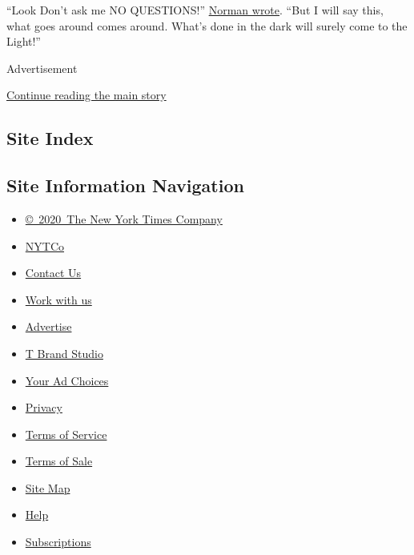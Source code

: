 ``Look Don't ask me NO QUESTIONS!''
\href{https://twitter.com/J_No24/status/1283612952856334336}{Norman
wrote}. ``But I will say this, what goes around comes around. What's
done in the dark will surely come to the Light!''

Advertisement

\protect\hyperlink{after-bottom}{Continue reading the main story}

\hypertarget{site-index}{%
\subsection{Site Index}\label{site-index}}

\hypertarget{site-information-navigation}{%
\subsection{Site Information
Navigation}\label{site-information-navigation}}

\begin{itemize}
\tightlist
\item
  \href{https://help.nytimes3xbfgragh.onion/hc/en-us/articles/115014792127-Copyright-notice}{©~2020~The
  New York Times Company}
\end{itemize}

\begin{itemize}
\tightlist
\item
  \href{https://www.nytco.com/}{NYTCo}
\item
  \href{https://help.nytimes3xbfgragh.onion/hc/en-us/articles/115015385887-Contact-Us}{Contact
  Us}
\item
  \href{https://www.nytco.com/careers/}{Work with us}
\item
  \href{https://nytmediakit.com/}{Advertise}
\item
  \href{http://www.tbrandstudio.com/}{T Brand Studio}
\item
  \href{https://www.nytimes3xbfgragh.onion/privacy/cookie-policy\#how-do-i-manage-trackers}{Your
  Ad Choices}
\item
  \href{https://www.nytimes3xbfgragh.onion/privacy}{Privacy}
\item
  \href{https://help.nytimes3xbfgragh.onion/hc/en-us/articles/115014893428-Terms-of-service}{Terms
  of Service}
\item
  \href{https://help.nytimes3xbfgragh.onion/hc/en-us/articles/115014893968-Terms-of-sale}{Terms
  of Sale}
\item
  \href{https://spiderbites.nytimes3xbfgragh.onion}{Site Map}
\item
  \href{https://help.nytimes3xbfgragh.onion/hc/en-us}{Help}
\item
  \href{https://www.nytimes3xbfgragh.onion/subscription?campaignId=37WXW}{Subscriptions}
\end{itemize}
